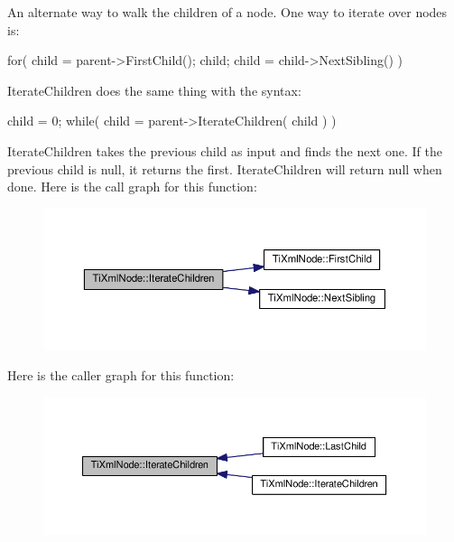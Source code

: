 An alternate way to walk the children of a node. One way to iterate over nodes is\+: \begin{DoxyVerb}    for( child = parent->FirstChild(); child; child = child->NextSibling() )
\end{DoxyVerb}


Iterate\+Children does the same thing with the syntax\+: \begin{DoxyVerb}    child = 0;
    while( child = parent->IterateChildren( child ) )
\end{DoxyVerb}


Iterate\+Children takes the previous child as input and finds the next one. If the previous child is null, it returns the first. Iterate\+Children will return null when done. Here is the call graph for this function\+:\nopagebreak
\begin{figure}[H]
\begin{center}
\leavevmode
\includegraphics[width=350pt]{class_ti_xml_node_a67c3a02b797f08d9a31b2553661257e1_cgraph}
\end{center}
\end{figure}
Here is the caller graph for this function\+:\nopagebreak
\begin{figure}[H]
\begin{center}
\leavevmode
\includegraphics[width=350pt]{class_ti_xml_node_a67c3a02b797f08d9a31b2553661257e1_icgraph}
\end{center}
\end{figure}
\mbox{\label{class_ti_xml_node_a2358e747118fdbf0e467b1e4f7d03de1}} 
